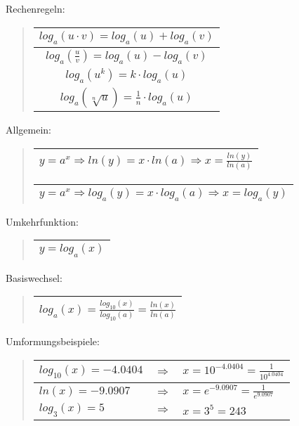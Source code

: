 Rechenregeln:
\begin{verse}
\begin{tabular}{|c|}
\hline 
$log_{a}(u\cdot v)=log_{a}(u)+log_{a}(v)$\tabularnewline
\hline 
$log_{a}(\frac{u}{v})=log_{a}(u)-log_{a}(v)$\tabularnewline
\hline 
$log_{a}(u^{k})=k\cdot log_{a}(u)$\tabularnewline
\hline 
$log_{a}(\sqrt[n]{u})=\frac{1}{n}\cdot log_{a}(u)$\tabularnewline
\hline 
\end{tabular}
\end{verse}
Allgemein:
\begin{verse}
\begin{tabular}{|c|}
\hline 
$y=a^{x}\Rightarrow ln(y)=x\cdot ln(a)\Rightarrow x=\frac{ln(y)}{ln(a)}$\tabularnewline
\hline 
\end{tabular}

\begin{tabular}{|c|}
\hline 
$y=a^{x}\Rightarrow log_{a}(y)=x\cdot log_{a}(a)\Rightarrow x=log_{a}(y)$ \tabularnewline
\hline 
\end{tabular}
\end{verse}
Umkehrfunktion:
\begin{verse}
\begin{tabular}{|c|}
\hline 
$y=log_{a}(x)$\tabularnewline
\hline 
\end{tabular}
\end{verse}
Basiswechsel:
\begin{verse}
\begin{tabular}{|c|}
\hline 
$log_{a}(x)=\frac{log_{10}(x)}{log_{10}(a)}=\frac{ln(x)}{ln(a)}$\tabularnewline
\hline 
\end{tabular}
\end{verse}
Umformungsbeispiele:
\begin{verse}
\begin{tabular}{|l|l|l|}
\hline 
$log_{10}(x)=-4.0404$ & $\Rightarrow$ & $x=10^{-4.0404}=\frac{1}{10^{4.0404}}$\tabularnewline
\hline 
$ln(x)=-9.0907$ & $\Rightarrow$ & $x=e^{-9.0907}=\frac{1}{e^{9.0907}}$\tabularnewline
\hline 
$log_{3}(x)=5$ & $\Rightarrow$ & $x=3^{5}=243$\tabularnewline
\hline 
\end{tabular}\end{verse}

